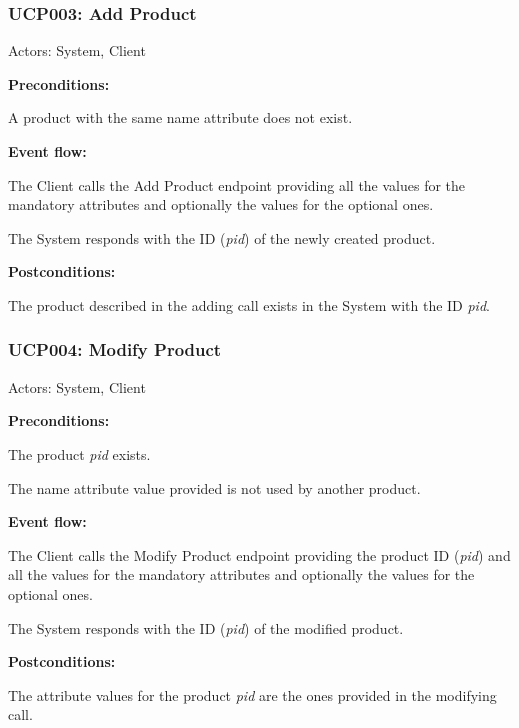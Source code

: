 \begin{ucbox}{\subsubsection{UCP003: Add Product}}
\label{UCP003}

Actors: System, Client

\textbf{Preconditions:} 

\ucitem A product with the same name attribute does not exist.

\textbf{Event flow:}

\ucitem The Client calls the Add Product endpoint providing all the values for the mandatory attributes and optionally the values for the optional ones.

\ucitem The System responds with the ID (\textit{pid}) of the newly created product.

\textbf{Postconditions:}

\ucitem The product described in the adding call exists in the System with the ID \textit{pid}.

\end{ucbox}

\begin{ucbox}{\subsubsection{UCP004: Modify Product}}
\label{UCP004}

Actors: System, Client

\textbf{Preconditions:}

\ucitem The product \textit{pid} exists.

\ucitem The name attribute value provided is not used by another product.

\textbf{Event flow:}

\ucitem The Client calls the Modify Product endpoint providing the product ID (\textit{pid}) and all the values for the mandatory attributes and optionally the values for the optional ones.

\ucitem The System responds with the ID (\textit{pid}) of the modified product.

\textbf{Postconditions:}

\ucitem The attribute values for the product \textit{pid} are the ones provided in the modifying call.

\end{ucbox}

